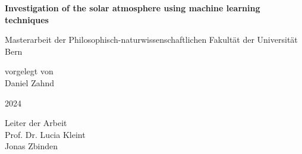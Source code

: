 
\begin{titlepage}
\begin{center}
\vspace*{3.5cm}

\Large \textbf{Investigation of the solar atmosphere using machine learning techniques}

\vspace{2.5cm}

\normalsize Masterarbeit der Philosophisch-naturwissenschaftlichen Fakultät der Universität Bern \\

\vspace{2.0cm}

\normalsize vorgelegt von \\
\vspace{0.2cm}
Daniel Zahnd \\

\vspace{2.5cm}

2024 \\

\vspace{3.5cm}

Leiter der Arbeit \\
\vspace{0.2cm}
Prof. Dr. Lucia Kleint \\
Jonas Zbinden


\centering    

    
\end{center}
\end{titlepage}

%
%
%
%
%
%
%
%
%    
